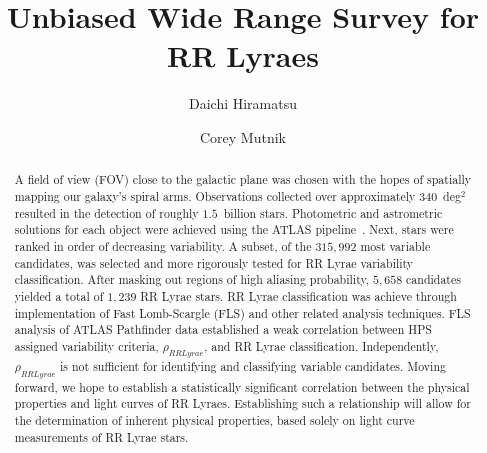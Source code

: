 \documentclass[aps,prb,twocolumn,superscriptaddress]{revtex4-1}
\begin{document}
\title{Unbiased Wide Range Survey for RR Lyraes}


%


\author{Daichi Hiramatsu}
\author{Corey Mutnik}



\begin{abstract}
A field of view (FOV) close to the galactic plane was chosen with the hopes of spatially mapping our galaxy's spiral arms.  
Observations collected over approximately $340$~deg$^{2}$ resulted in the detection of roughly $1.5$~billion stars.  Photometric and astrometric solutions for each object were achieved using the ATLAS pipeline~\cite{gri}.  Next, stars were ranked in order of decreasing variability.  A subset, of the $315,992$ most variable candidates, was selected and more rigorously tested for RR Lyrae variability classification.  After masking out regions of high aliasing probability, $5,658$ candidates yielded a total of $1,239$ RR Lyrae stars.  RR Lyrae classification was achieve through implementation of Fast Lomb-Scargle (FLS) and other related analysis techniques.  
FLS analysis of ATLAS Pathfinder data established a weak correlation between HPS assigned variability criteria, $\rho_{RRLyrae}$, and RR Lyrae classification.  Independently, $\rho_{RRLyrae}$ is not sufficient for identifying and classifying variable candidates.  
Moving forward, we hope to establish a statistically significant correlation between the physical properties and light curves of RR Lyraes.  
Establishing such a relationship will allow for the determination of inherent physical properties, based solely on light curve measurements of RR Lyrae stars.
\end{abstract}
\end{document}
